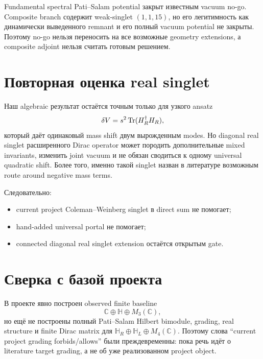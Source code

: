 \begin{theorem}
Fundamental spectral Pati--Salam potential закрыт известным vacuum no-go.
Composite branch содержит weak-singlet \((1,1,15)\), но его легитимность как
динамически выведенного remnant и его полный vacuum potential не закрыты.
Поэтому no-go нельзя переносить на все возможные geometry extensions, а
composite adjoint нельзя считать готовым решением.
\end{theorem}

\section{Повторная оценка real singlet}

Наш algebraic результат остаётся точным только для узкого ansatz
\begin{equation}
 \delta V=s^2\operatorname{Tr}(H_R^\dagger H_R),
\end{equation}
который даёт одинаковый mass shift двум вырожденным modes. Но diagonal real
singlet расширенного Dirac operator может породить дополнительные mixed
invariants, изменить joint vacuum и не обязан сводиться к одному universal
quadratic shift. Более того, именно такой singlet назван в литературе
возможным route around negative mass terms.

Следовательно:
\begin{itemize}
 \item current project Coleman--Weinberg singlet в direct sum не помогает;
 \item hand-added universal portal не помогает;
 \item connected diagonal real singlet extension остаётся открытым gate.
\end{itemize}

\section{Сверка с базой проекта}

В проекте явно построен observed finite baseline
\begin{equation}
 \mathbb C\oplus\mathbb H\oplus M_3(\mathbb C),
\end{equation}
но ещё не построены полный Pati--Salam Hilbert bimodule, grading, real
structure и finite Dirac matrix для
\(\mathbb H_R\oplus\mathbb H_L\oplus M_4(\mathbb C)\). Поэтому слова
``current project grading forbids/allows'' были преждевременны: пока речь
идёт о literature target grading, а не об уже реализованном project object.

